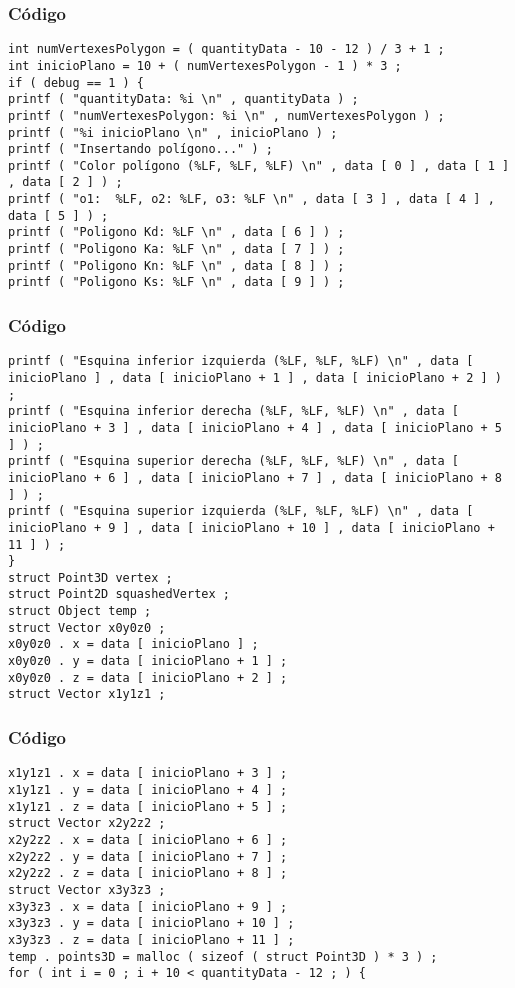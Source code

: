 \documentclass{beamer}
\begin{document}
\begin{frame}[fragile]
\frametitle{C\'odigo}
\begin{verbatim}
int numVertexesPolygon = ( quantityData - 10 - 12 ) / 3 + 1 ; 
int inicioPlano = 10 + ( numVertexesPolygon - 1 ) * 3 ; 
if ( debug == 1 ) { 
printf ( "quantityData: %i \n" , quantityData ) ; 
printf ( "numVertexesPolygon: %i \n" , numVertexesPolygon ) ; 
printf ( "%i inicioPlano \n" , inicioPlano ) ; 
printf ( "Insertando polígono..." ) ; 
printf ( "Color polígono (%LF, %LF, %LF) \n" , data [ 0 ] , data [ 1 ] , data [ 2 ] ) ; 
printf ( "o1:  %LF, o2: %LF, o3: %LF \n" , data [ 3 ] , data [ 4 ] , data [ 5 ] ) ; 
printf ( "Poligono Kd: %LF \n" , data [ 6 ] ) ; 
printf ( "Poligono Ka: %LF \n" , data [ 7 ] ) ; 
printf ( "Poligono Kn: %LF \n" , data [ 8 ] ) ; 
printf ( "Poligono Ks: %LF \n" , data [ 9 ] ) ; 
\end{verbatim}
\end{frame}
\begin{frame}[fragile]
\frametitle{C\'odigo}
\begin{verbatim}
printf ( "Esquina inferior izquierda (%LF, %LF, %LF) \n" , data [ inicioPlano ] , data [ inicioPlano + 1 ] , data [ inicioPlano + 2 ] ) ; 
printf ( "Esquina inferior derecha (%LF, %LF, %LF) \n" , data [ inicioPlano + 3 ] , data [ inicioPlano + 4 ] , data [ inicioPlano + 5 ] ) ; 
printf ( "Esquina superior derecha (%LF, %LF, %LF) \n" , data [ inicioPlano + 6 ] , data [ inicioPlano + 7 ] , data [ inicioPlano + 8 ] ) ; 
printf ( "Esquina superior izquierda (%LF, %LF, %LF) \n" , data [ inicioPlano + 9 ] , data [ inicioPlano + 10 ] , data [ inicioPlano + 11 ] ) ; 
} 
struct Point3D vertex ; 
struct Point2D squashedVertex ; 
struct Object temp ; 
struct Vector x0y0z0 ; 
x0y0z0 . x = data [ inicioPlano ] ; 
x0y0z0 . y = data [ inicioPlano + 1 ] ; 
x0y0z0 . z = data [ inicioPlano + 2 ] ; 
struct Vector x1y1z1 ; 
\end{verbatim}
\end{frame}
\begin{frame}[fragile]
\frametitle{C\'odigo}
\begin{verbatim}
x1y1z1 . x = data [ inicioPlano + 3 ] ; 
x1y1z1 . y = data [ inicioPlano + 4 ] ; 
x1y1z1 . z = data [ inicioPlano + 5 ] ; 
struct Vector x2y2z2 ; 
x2y2z2 . x = data [ inicioPlano + 6 ] ; 
x2y2z2 . y = data [ inicioPlano + 7 ] ; 
x2y2z2 . z = data [ inicioPlano + 8 ] ; 
struct Vector x3y3z3 ; 
x3y3z3 . x = data [ inicioPlano + 9 ] ; 
x3y3z3 . y = data [ inicioPlano + 10 ] ; 
x3y3z3 . z = data [ inicioPlano + 11 ] ; 
temp . points3D = malloc ( sizeof ( struct Point3D ) * 3 ) ; 
for ( int i = 0 ; i + 10 < quantityData - 12 ; ) { 
\end{verbatim}
\end{frame}
\end{document}

